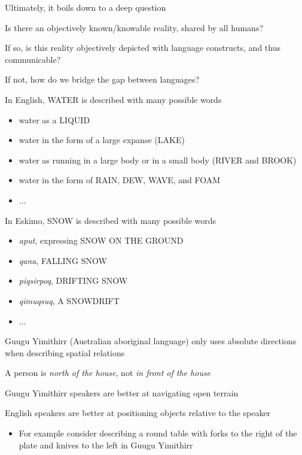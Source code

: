 \documentclass{beamer}
\begin{document}
\begin{slide}{
\item Ultimately, it boils down to a deep question
\item Is there an objectively known/knowable reality, shared by all humans?
\item If so, is this reality objectively depicted with language constructs, and thus communicable?
\item If not, how do we bridge the gap between languages?
}\end{slide}

\begin{slide}{
\item In English, WATER is described with many possible words
\begin{itemize}
\item water as a LIQUID
\item water in the form of a large expanse (LAKE)
\item water as running in a large body or in a small body (RIVER and BROOK)
\item water in the form of RAIN, DEW, WAVE, and FOAM
\item ... 
\end{itemize}
}\end{slide}

\begin{slide}{
\item In Eskimo, SNOW is described with many possible words
\begin{itemize}
\item \textit{aput}, expressing SNOW ON THE GROUND
\item \textit{qana}, FALLING SNOW
\item \textit{piqsirpoq}, DRIFTING SNOW
\item \textit{qimuqsuq}, A SNOWDRIFT
\item ... 
\end{itemize}
}\end{slide}

\begin{slide}{
\item Guugu Yimithirr (Australian aboriginal language) only uses absolute directions when describing spatial relations
\item A person is \textit{north of the house}, not \textit{in front of the house}
\item Guugu Yimithirr speakers are better at navigating open terrain
\item English speakers are better at positioning objects relative to the speaker 
\begin{itemize}
\item For example consider describing a round table with forks to the right of the plate and knives to the left in Guugu Yimithirr
\end{itemize}
}\end{slide}
\end{document}
